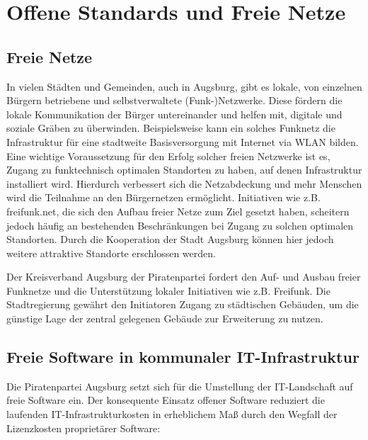 \chapter{Offene Standards und Freie Netze}
  
  \section{Freie Netze}
  
  In vielen Städten und Gemeinden, auch in Augsburg, gibt es lokale, von 
  einzelnen Bürgern betriebene und selbstverwaltete (Funk-)Netzwerke. Diese 
  fördern die lokale Kommunikation der Bürger untereinander und helfen mit, 
  digitale und soziale Gräben zu überwinden. Beispielsweise kann ein solches 
  Funknetz die Infrastruktur für eine stadtweite Basisversorgung mit Internet 
  via WLAN bilden. Eine wichtige Voraussetzung für den Erfolg solcher freien 
  Netzwerke ist es, Zugang zu funktechnisch optimalen Standorten zu haben, auf 
  denen Infrastruktur installiert wird. Hierdurch verbessert sich die 
  Netzabdeckung und mehr Menschen wird die Teilnahme an den Bürgernetzen 
  ermöglicht. Initiativen wie z.B. freifunk.net, die sich den Aufbau freier 
  Netze zum Ziel gesetzt haben, scheitern jedoch häufig an bestehenden 
  Beschränkungen bei Zugang zu solchen optimalen Standorten. Durch die 
  Kooperation der Stadt Augsburg können hier jedoch weitere attraktive 
  Standorte erschlossen werden.
  
  Der Kreisverband Augsburg der Piratenpartei fordert den Auf- und Ausbau 
  freier Funknetze und die Unterstützung lokaler Initiativen wie z.B. 
  Freifunk. Die Stadtregierung gewährt den Initiatoren Zugang zu 
  städtischen Gebäuden, um die günstige Lage der zentral gelegenen Gebäude zur 
  Erweiterung zu nutzen. 
  
  \section{Freie Software in kommunaler IT-Infrastruktur}
  \label{sec:Freie Software in kommunaler IT-Infrastruktur}
  
  Die Piratenpartei Augsburg setzt sich für die Umstellung der IT-Landschaft 
  auf freie Software ein. Der konsequente Einsatz offener Software reduziert 
  die laufenden IT-Infrastrukturkosten in erheblichem Maß durch den Wegfall 
  der Lizenzkosten proprietärer Software:
  
